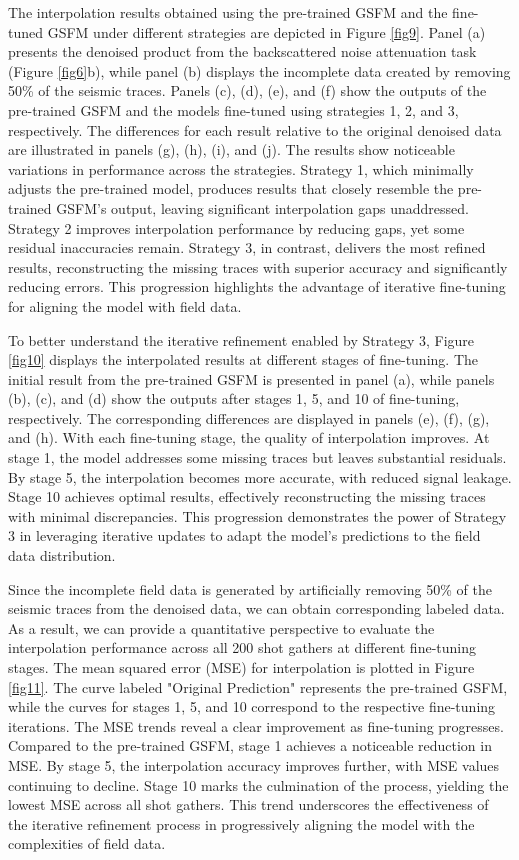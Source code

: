 The interpolation results obtained using the pre-trained GSFM and the fine-tuned GSFM under different strategies are depicted in Figure \ref{fig9}. Panel (a) presents the denoised product from the backscattered noise attenuation task (Figure \ref{fig6}b), while panel (b) displays the incomplete data created by removing 50\% of the seismic traces. Panels (c), (d), (e), and (f) show the outputs of the pre-trained GSFM and the models fine-tuned using strategies 1, 2, and 3, respectively. The differences for each result relative to the original denoised data are illustrated in panels (g), (h), (i), and (j). The results show noticeable variations in performance across the strategies. Strategy 1, which minimally adjusts the pre-trained model, produces results that closely resemble the pre-trained GSFM’s output, leaving significant interpolation gaps unaddressed. Strategy 2 improves interpolation performance by reducing gaps, yet some residual inaccuracies remain. Strategy 3, in contrast, delivers the most refined results, reconstructing the missing traces with superior accuracy and significantly reducing errors. This progression highlights the advantage of iterative fine-tuning for aligning the model with field data. 

To better understand the iterative refinement enabled by Strategy 3, Figure \ref{fig10} displays the interpolated results at different stages of fine-tuning. The initial result from the pre-trained GSFM is presented in panel (a), while panels (b), (c), and (d) show the outputs after stages 1, 5, and 10 of fine-tuning, respectively. The corresponding differences are displayed in panels (e), (f), (g), and (h). With each fine-tuning stage, the quality of interpolation improves. At stage 1, the model addresses some missing traces but leaves substantial residuals. By stage 5, the interpolation becomes more accurate, with reduced signal leakage. Stage 10 achieves optimal results, effectively reconstructing the missing traces with minimal discrepancies. This progression demonstrates the power of Strategy 3 in leveraging iterative updates to adapt the model's predictions to the field data distribution. 

Since the incomplete field data is generated by artificially removing 50\% of the seismic traces from the denoised data, we can obtain corresponding labeled data. As a result, we can provide a quantitative perspective to evaluate the interpolation performance across all 200 shot gathers at different fine-tuning stages. The mean squared error (MSE) for interpolation is plotted in Figure \ref{fig11}. The curve labeled "Original Prediction" represents the pre-trained GSFM, while the curves for stages 1, 5, and 10 correspond to the respective fine-tuning iterations. The MSE trends reveal a clear improvement as fine-tuning progresses. Compared to the pre-trained GSFM, stage 1 achieves a noticeable reduction in MSE. By stage 5, the interpolation accuracy improves further, with MSE values continuing to decline. Stage 10 marks the culmination of the process, yielding the lowest MSE across all shot gathers. This trend underscores the effectiveness of the iterative refinement process in progressively aligning the model with the complexities of field data. 

